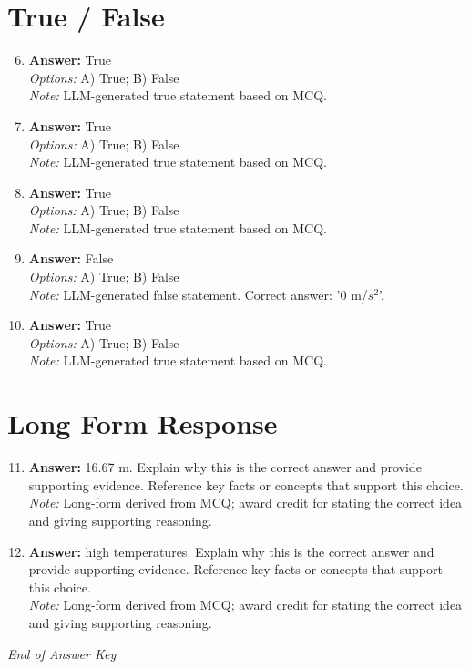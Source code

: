 \documentclass[12pt]{article}
\begin{document}
\section*{True / False}
\begin{enumerate}[label=\arabic*.]
\setcounter{enumi}{5}
\item \textbf{Answer:} True
\\ \textit{Options:} A) True; B) False
\\ \textit{Note:} LLM-generated true statement based on MCQ.
\item \textbf{Answer:} True
\\ \textit{Options:} A) True; B) False
\\ \textit{Note:} LLM-generated true statement based on MCQ.
\item \textbf{Answer:} True
\\ \textit{Options:} A) True; B) False
\\ \textit{Note:} LLM-generated true statement based on MCQ.
\item \textbf{Answer:} False
\\ \textit{Options:} A) True; B) False
\\ \textit{Note:} LLM-generated false statement. Correct answer: '0 m/$s^2$'.
\item \textbf{Answer:} True
\\ \textit{Options:} A) True; B) False
\\ \textit{Note:} LLM-generated true statement based on MCQ.
\end{enumerate}

\section*{Long Form Response}
\begin{enumerate}[label=\arabic*.]
\setcounter{enumi}{10}
\item \textbf{Answer:} 16.67 m. Explain why this is the correct answer and provide supporting evidence. Reference key facts or concepts that support this choice.
\\ \textit{Note:} Long-form derived from MCQ; award credit for stating the correct idea and giving supporting reasoning.
\item \textbf{Answer:} high temperatures. Explain why this is the correct answer and provide supporting evidence. Reference key facts or concepts that support this choice.
\\ \textit{Note:} Long-form derived from MCQ; award credit for stating the correct idea and giving supporting reasoning.
\end{enumerate}

\vfill
\noindent\textit{End of Answer Key}
\end{document}
